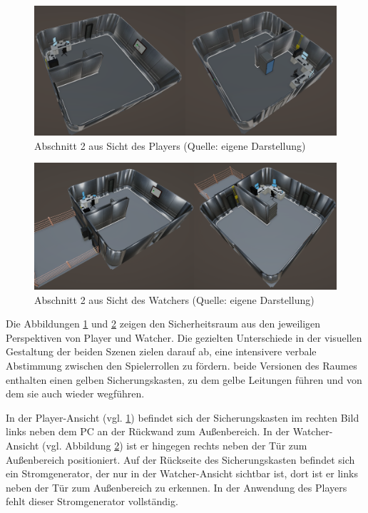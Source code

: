 \begin{figure}[ht]
\centering
\includegraphics[width=1\linewidth]{content/pictures/Abschnitt_01 - Player.png}
\caption{Abschnitt 2 aus Sicht des Players (Quelle: eigene Darstellung)}
\label{fig:section_01_player}
\end{figure}

\begin{figure}[ht]
\centering
\includegraphics[width=1\linewidth]{content/pictures/Abschnitt_01 - Watcher.png}
\caption{Abschnitt 2 aus Sicht des Watchers (Quelle: eigene Darstellung)}
\label{fig:section_01_watcher}
\end{figure}

Die Abbildungen \ref{fig:section_01_player} und \ref{fig:section_01_watcher} zeigen den Sicherheitsraum aus den jeweiligen Perspektiven von Player und Watcher. Die gezielten Unterschiede in der visuellen Gestaltung der beiden Szenen zielen darauf ab, eine intensivere verbale Abstimmung zwischen den Spielerrollen zu fördern. beide Versionen des Raumes enthalten einen gelben Sicherungskasten, zu dem gelbe Leitungen führen und von dem sie auch wieder wegführen.

In der Player-Ansicht (vgl. \ref{fig:section_01_player}) befindet sich der Sicherungskasten im rechten Bild links neben dem PC an der Rückwand zum Außenbereich. In der Watcher-Ansicht (vgl. Abbildung \ref{fig:section_01_watcher}) ist er hingegen rechts neben der Tür zum Außenbereich positioniert. Auf der Rückseite des Sicherungskasten befindet sich ein Stromgenerator, der nur in der Watcher-Ansicht sichtbar ist, dort ist er links neben der Tür zum Außenbereich zu erkennen. In der Anwendung des Players fehlt dieser Stromgenerator vollständig.

